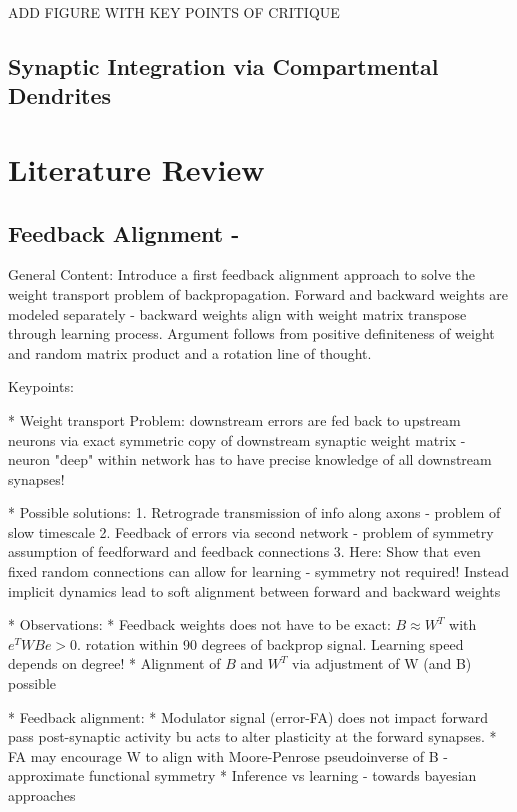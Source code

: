 \documentclass[colorinlistoftodos]{article}
\theoremstyle{definition}
\begin{document}
ADD FIGURE WITH KEY POINTS OF CRITIQUE

\subsection*{Synaptic Integration via Compartmental Dendrites}


\newpage
\section{Literature Review}

\subsection*{Feedback Alignment - \citet{lillicrap2016}}

General Content: Introduce a first feedback alignment approach to solve the weight transport problem of backpropagation. Forward and backward weights are modeled separately - backward weights align with weight matrix transpose through learning process. Argument follows from positive definiteness of weight and random matrix product and a rotation line of thought.


Keypoints:

* Weight transport Problem: downstream errors are fed back to upstream neurons via exact symmetric copy of downstream synaptic weight matrix - neuron "deep" within network has to have precise knowledge of all downstream synapses!

* Possible solutions:
    1. Retrograde transmission of info along axons - problem of slow timescale
    2. Feedback of errors via second network - problem of symmetry assumption of feedforward and feedback connections
    3. Here: Show that even fixed random connections can allow for learning - symmetry not required! Instead implicit dynamics lead to soft alignment between forward and backward weights

* Observations:
    * Feedback weights does not have to be exact: $B \approx W^T$ with $e^TWBe > 0$. rotation within 90 degrees of backprop signal. Learning speed depends on degree!
    * Alignment of $B$ and $W^T$ via adjustment of W (and B) possible

* Feedback alignment:
    * Modulator signal (error-FA) does not impact forward pass post-synaptic activity bu acts to alter plasticity at the forward synapses.
    * FA may encourage W to align with Moore-Penrose pseudoinverse of B - approximate functional symmetry
    * Inference vs learning - towards bayesian approaches
\end{document}
